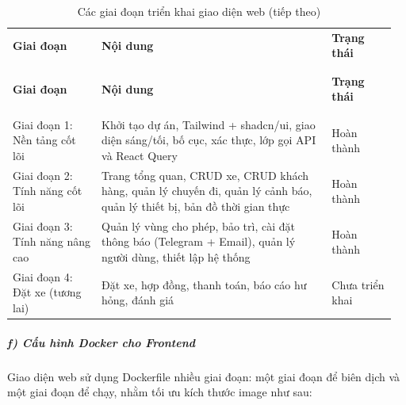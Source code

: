 \documentclass[a4paper]{extarticle}
\newcommand{\thesissettableid}[2]{%
  \renewcommand{\thetable}{#1}%
  \renewcommand{\theHtable}{#2}%
}
\begin{document}
{\thesissettableid{4.9}{tab-ch4-cac-giai-oan-trien-khai-frontend}
\def\LTcaptype{table}
\begin{longtable}{|L{0.224\linewidth}|L{0.580\linewidth}|L{0.160\linewidth}|}
\caption{Các giai đoạn triển khai giao diện web}\label{tab:ch4-cac-giai-oan-trien-khai-frontend}\\
\hline \textbf{Giai đoạn} & \textbf{Nội dung} & \textbf{Trạng thái} \\
\\\hline
\endfirsthead
\caption[]{Các giai đoạn triển khai giao diện web (tiếp theo)}\\
\hline \textbf{Giai đoạn} & \textbf{Nội dung} & \textbf{Trạng thái} \\
\\\hline
\endhead
\\\hline
\endfoot
\endlastfoot
Giai đoạn 1: Nền tảng cốt lõi & Khởi tạo dự án, Tailwind + shadcn/ui,
giao diện sáng/tối, bố cục, xác thực, lớp gọi API và React Query & Hoàn thành \\\hline
Giai đoạn 2: Tính năng cốt lõi & Trang tổng quan, CRUD xe, CRUD khách hàng, quản lý chuyến đi,
quản lý cảnh báo, quản lý thiết bị, bản đồ thời gian thực & Hoàn
thành \\\hline
Giai đoạn 3: Tính năng nâng cao & Quản lý vùng cho phép, bảo trì,
cài đặt thông báo (Telegram + Email), quản lý người dùng, thiết lập hệ thống &
Hoàn thành \\\hline
Giai đoạn 4: Đặt xe (tương lai) & Đặt xe, hợp đồng, thanh toán, báo cáo
hư hỏng, đánh giá & Chưa triển khai \\\hline
\end{longtable}
}


\subparagraph{f) Cấu hình Docker cho
Frontend}\label{f-cux1ea5u-huxecnh-docker-cho-frontend}

Giao diện web sử dụng Dockerfile nhiều giai đoạn: một giai đoạn để biên
dịch và một giai đoạn để chạy, nhằm tối ưu kích thước image như sau:
\end{document}
